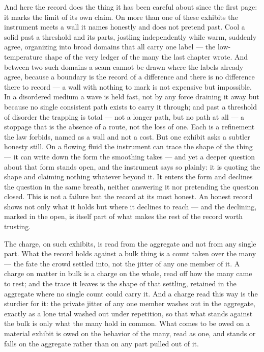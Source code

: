 And here the record does the thing it has been careful about since the first page: it marks the limit of its own
claim. On more than one of these exhibits the instrument meets a wall it names honestly and does not pretend
past. Cool a solid past a threshold and its parts, jostling
independently while warm, suddenly agree, organizing into broad domains that all carry one label --- the
low-temperature shape of the very ledger of the many the last chapter wrote. And between two such domains a seam
cannot be drawn where the labels already agree, because a boundary is the record of a difference and there is no
difference there to record --- a wall with nothing to mark is not expensive but impossible. In a disordered
medium a wave is held fast, not by any force draining it away but because no single consistent path exists to
carry it through; and past a threshold of disorder the trapping is total --- not a longer path, but no path at
all --- a stoppage that is the absence of a route, not the loss of one. Each is a refinement the law forbids, named as a wall and not a cost. But one exhibit asks a
subtler honesty still. On a flowing fluid the instrument can trace the shape of the thing --- it can write down
the form the smoothing takes --- and yet a deeper question about that form stands open, and the instrument says
so plainly: it is quoting the shape and claiming nothing whatever beyond it. It enters the form and declines the
question in the same breath, neither answering it nor pretending the question closed. This is not a failure but
the record at its most honest. An honest record shows not only what it holds but where it declines to reach ---
and the declining, marked in the open, is itself part of what makes the rest of the record worth trusting.

The charge, on such exhibits, is read from the aggregate and not from any single part. What the record holds
against a bulk thing is a count taken over the many --- the fate the crowd settled into, not the jitter of any
one member of it. A charge on matter in bulk is a charge on the whole, read off how the many came to rest; and
the trace it leaves is the shape of that settling, retained in the aggregate where no single count could carry
it. And a charge read this way is the sturdier for it: the private jitter of any one member washes out in the
aggregate, exactly as a lone trial washed out under repetition, so that what stands against the bulk is only
what the many hold in common. What comes to be owed on a material exhibit is owed on the behavior of the many,
read as one, and stands or falls on the aggregate rather than on any part pulled out of it.


